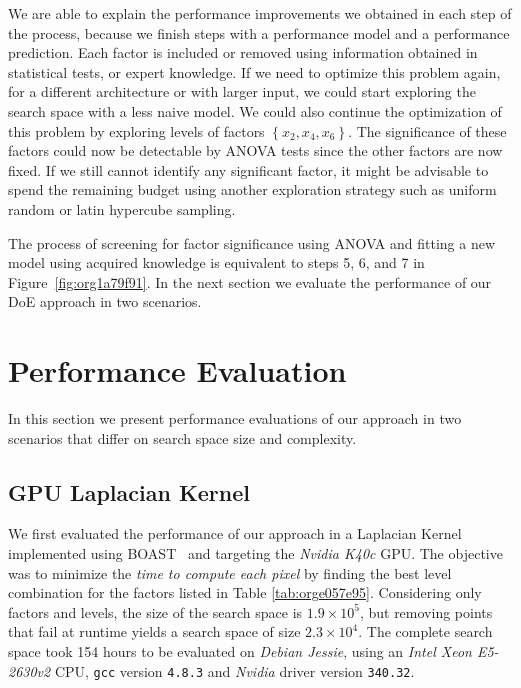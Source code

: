 \documentclass[conference]{IEEEtran}
\begin{document}
We are able to explain the performance improvements we obtained in each step of
the process, because we finish steps with a performance model and a performance
prediction. Each factor is included or removed using information obtained in
statistical tests, or expert knowledge. If we need to optimize this problem
again, for a different architecture or with larger input, we could start
exploring the search space with a less naive model. We could also continue the
optimization of this problem by exploring levels of factors
\(\left\{x_2,x_4,x_6\right\}\). The significance of these factors could now be
detectable by ANOVA tests since the other factors are now fixed. If we still
cannot identify any significant factor, it might be advisable to spend the
remaining budget using another exploration strategy such as uniform random or
latin hypercube sampling.

The process of screening for factor significance using ANOVA and fitting a new
model using acquired knowledge is equivalent to steps 5, 6, and 7 in
Figure~\ref{fig:org1a79f91}. In the next section we evaluate the
performance of our DoE approach in two scenarios.
\section{Performance Evaluation}
\label{sec:orga2a77cb}
In this section we present performance evaluations of our approach in two
scenarios that differ on search space size and complexity.
\vspace{-5pt}
\subsection{GPU Laplacian Kernel}
\label{sec:org7d19cf7}
We first evaluated the performance of our approach in a Laplacian Kernel
implemented using BOAST~\cite{videau2017boast} and targeting the \emph{Nvidia
K40c} GPU. The objective was to minimize the \emph{time to compute each pixel} by
finding the best level combination for the factors listed in Table
\ref{tab:orge057e95}. Considering only factors and levels, the size of the
search space is \(1.9\times10^5\), but removing points that fail at runtime yields
a search space of size \(2.3\times10^4\). The complete search space took 154 hours
to be evaluated on \emph{Debian Jessie}, using an \emph{Intel Xeon E5-2630v2} CPU,
\texttt{gcc} version \texttt{4.8.3} and \emph{Nvidia} driver version \texttt{340.32}.
\end{document}
